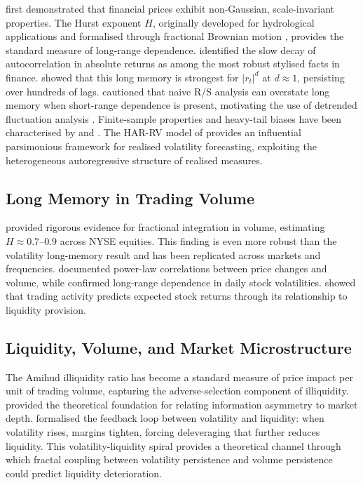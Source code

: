 \documentclass[preprint,12pt,authoryear]{elsarticle}
\begin{document}
\citet{mandelbrot1963variation} first demonstrated that financial prices exhibit non-Gaussian, scale-invariant properties. The Hurst exponent $H$, originally developed for hydrological applications \citep{hurst1951long} and formalised through fractional Brownian motion \citep{mandelbrot1968fractional}, provides the standard measure of long-range dependence. \citet{cont2001empirical} identified the slow decay of autocorrelation in absolute returns as among the most robust stylised facts in finance. \citet{ding1993long} showed that this long memory is strongest for $|r_t|^d$ at $d \approx 1$, persisting over hundreds of lags. \citet{lo1991long} cautioned that naive R/S analysis can overstate long memory when short-range dependence is present, motivating the use of detrended fluctuation analysis \citep{peng1994mosaic}. Finite-sample properties and heavy-tail biases have been characterised by \citet{weron2002estimating} and \citet{barunik2010hurst}. The HAR-RV model of \citet{corsi2009simple} provides an influential parsimonious framework for realised volatility forecasting, exploiting the heterogeneous autoregressive structure of realised measures.

\subsection{Long Memory in Trading Volume}

\citet{lobato2000long} provided rigorous evidence for fractional integration in volume, estimating $H \approx 0.7$--$0.9$ across NYSE equities. This finding is even more robust than the volatility long-memory result and has been replicated across markets and frequencies. \citet{plerou2003two} documented power-law correlations between price changes and volume, while \citet{ray2000long} confirmed long-range dependence in daily stock volatilities. \citet{chordia2001trading} showed that trading activity predicts expected stock returns through its relationship to liquidity provision.

\subsection{Liquidity, Volume, and Market Microstructure}

The Amihud illiquidity ratio \citep{amihud2002illiquidity} has become a standard measure of price impact per unit of trading volume, capturing the adverse-selection component of illiquidity. \citet{kyle1985continuous} provided the theoretical foundation for relating information asymmetry to market depth. \citet{brunnermeier2009market} formalised the feedback loop between volatility and liquidity: when volatility rises, margins tighten, forcing deleveraging that further reduces liquidity. This volatility-liquidity spiral provides a theoretical channel through which fractal coupling between volatility persistence and volume persistence could predict liquidity deterioration.
\end{document}
